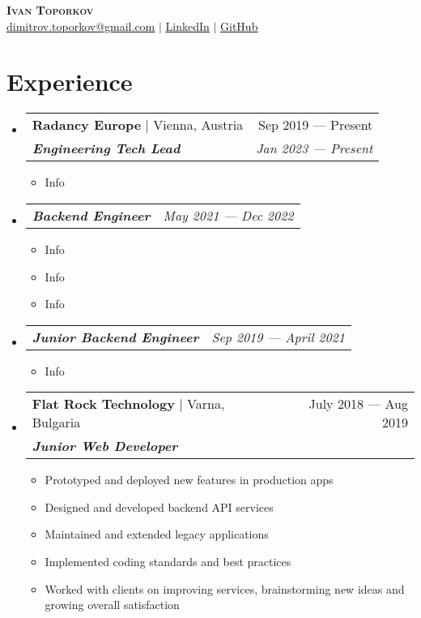 \documentclass[letterpaper,11pt]{article}
\makeatletter
\newcommand{\resumeItem}[1]{
  \item\small{
    {#1 \vspace{-2pt}}
  }
}
\newcommand{\resumeSubheading}[4]{
  \vspace{-2pt}\item
    \begin{tabular*}{0.97\textwidth}[t]{l@{\extracolsep{\fill}}r}
      #1 & #2 \\ %
      \textit{\small#3} & \textit{\small #4} \\
    \end{tabular*}\vspace{-7pt}
}
\newcommand{\resumeSubSubheading}[2]{
    \item
    \begin{tabular*}{0.97\textwidth}{l@{\extracolsep{\fill}}r}
      \textit{\small#1} & \textit{\small #2} \\
    \end{tabular*}\vspace{-7pt}
}
\newcommand{\resumeProjectHeading}[2]{
    \item
    \begin{tabular*}{0.97\textwidth}{l@{\extracolsep{\fill}}r}
      \small#1 & #2 \\
    \end{tabular*}\vspace{-7pt}
}
\newcommand{\resumeSubHeadingListStart}{\begin{itemize}[leftmargin=0.15in, label={}]}
\newcommand{\resumeSubHeadingListEnd}{\end{itemize}}
\newcommand{\resumeItemListStart}{\begin{itemize}}
\newcommand{\resumeItemListEnd}{\end{itemize}\vspace{-5pt}}
\makeatother
\begin{document}
\begin{center}
  \textbf{\Huge \scshape Ivan Toporkov} \\ \vspace{1pt}
  \small \href{mailto:dimitrov.toporkov@gmail.com}{\underline{dimitrov.toporkov@gmail.com}} $|$
  \href{https://linkedin.com/in/ivan-toporkov}{\underline{LinkedIn}} $|$
  \href{https://github.com/scyhhe}{\underline{GitHub}}
\end{center}

\section{Experience}
  \resumeSubHeadingListStart
    \resumeSubheading
      {\textbf{Radancy Europe} $|$ Vienna, Austria}{Sep 2019 --- Present}
      {\textbf{Engineering Tech Lead}}{Jan 2023 --- Present}
      \resumeItemListStart
        \resumeItem{Info}
      \resumeItemListEnd

    \resumeSubSubheading 
      {\textbf{Backend Engineer}}{May 2021 --- Dec 2022}
      \resumeItemListStart
        \resumeItem{Info}
        \resumeItem{Info}
        \resumeItem{Info}
      \resumeItemListEnd

    \resumeSubSubheading 
      {\textbf{Junior Backend Engineer}}{Sep 2019 --- April 2021}
      \resumeItemListStart
        \resumeItem{Info}
      \resumeItemListEnd

  \resumeSubHeadingListEnd
  \resumeSubHeadingListStart
    \resumeSubheading
      {\textbf{Flat Rock Technology} $|$ Varna, Bulgaria}{July 2018 --- Aug 2019}
      {\textbf{Junior Web Developer}}{}
      \resumeItemListStart
        \resumeItem{Prototyped and deployed new features in production apps}
        \resumeItem{Designed and developed backend API services}
        \resumeItem{Maintained and extended legacy applications}
        \resumeItem{Implemented coding standards and best practices}
        \resumeItem{Worked with clients on improving services, brainstorming new ideas and growing overall satisfaction}
      \resumeItemListEnd

  \resumeSubHeadingListEnd

\end{document}
